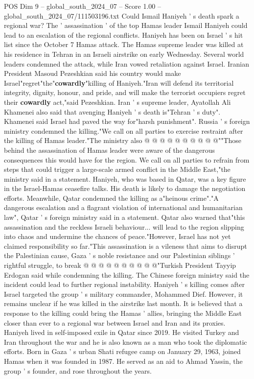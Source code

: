 \begin{textsample}{POS Dim 9 – global\_south\_2024\_07 – Score 1.00 – global\_south\_2024\_07/111503196.txt}  \label{ex:f9_pos_106}
Could Ismail Haniyeh ' s death spark a regional war?
The ' assassination ' of the top Hamas leader Ismail Haniyeh could lead to an escalation of the regional conflicts.
Haniyeh has been on Israel ' s hit list since the October 7 Hamas attack.
The Hamas supreme leader was killed at his residence in Tehran in an Israeli airstrike on early Wednesday.
Several world leaders condemned the attack, while Iran vowed retaliation against Israel.
Iranian President Masoud Pezeshkian said his country would make Israel"regret"the"\textbf{cowardly}"killing of Haniyeh."Iran will defend its territorial integrity, dignity, honour, and pride, and will make the terrorist occupiers regret their \textbf{cowardly} act,"said Pezeshkian.
Iran ' s supreme leader, Ayatollah Ali Khamenei also said that avenging Haniyeh ' s death is"Tehran ' s duty".
Khamenei said Israel had paved the way for"harsh punishment".
Russia ' s foreign ministry condemned the killing."We call on all parties to exercise restraint after the killing of Hamas leader."The ministry also @ @ @ @ @ @ @ @ @ @""Those behind the assassination of Hamas leader were aware of the dangerous consequences this would have for the region.
We call on all parties to refrain from steps that could trigger a large-scale armed conflict in the Middle East,"the ministry said in a statement.
Haniyeh, who was based in Qatar, was a key figure in the Israel-Hamas ceasefire talks.
His death is likely to damage the negotiation efforts.
Meanwhile, Qatar condemned the killing as a"heinous crime"."A dangerous escalation and a flagrant violation of international and humanitarian law", Qatar ' s foreign ministry said in a statement.
Qatar also warned that"this assassination and the reckless Israeli behaviour... will lead to the region slipping into chaos and undermine the chances of peace."However, Israel has not yet claimed responsibility so far."This assassination is a vileness that aims to disrupt the Palestinian cause, Gaza ' s noble resistance and our Palestinian siblings ' rightful struggle, to break @ @ @ @ @ @ @ @ @ @"Turkish President Tayyip Erdogan said while condemning the killing.
The Chinese foreign ministry said the incident could lead to further regional instability.
Haniyeh ' s killing comes after Israel targeted the group ' s military commander, Mohammed Dief.
However, it remains unclear if he was killed in the airstrike last month.
It is believed that a response to the killing could bring the Hamas ' allies, bringing the Middle East closer than ever to a regional war between Israel and Iran and its proxies.
Haniyeh lived in self-imposed exile in Qatar since 2019.
He visited Turkey and Iran throughout the war and he is also known as a man who took the diplomatic efforts.
Born in Gaza ' s urban Shati refugee camp on January 29, 1963, joined Hamas when it was founded in 1987.
He served as an aid to Ahmad Yassin, the group ' s founder, and rose throughout the years.

\end{textsample}

